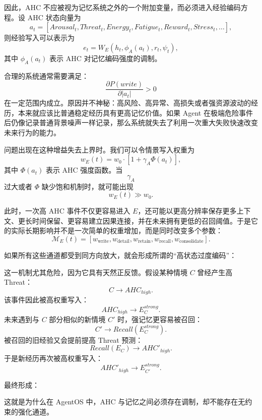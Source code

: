 因此，AHC 不应被视为记忆系统之外的一个附加变量，而必须进入经验编码方程。设 AHC 状态向量为
\[
a_t=
[
Arousal_t,
Threat_t,
Energy_t,
Fatigue_t,
Reward_t,
Stress_t,\ldots
],
\]
则经验写入可以表示为
\[
e_t
=
W_E
\left(
h_t,
\phi_A(a_t),
r_t,
\psi_t
\right),
\]
其中 $\phi_A(a_t)$ 表示 AHC 对记忆编码强度的调制。

合理的系统通常需要满足：
\[
\frac{\partial P(write)}{\partial |a_t|}
>0
\]
在一定范围内成立。原因并不神秘：高风险、高异常、高损失或者强资源波动的经历，本来就应该比普通稳定经历具有更高记忆价值。如果 Agent 在极端危险事件后仍像记录普通背景噪声一样记录，那么系统就失去了利用一次重大失败快速改变未来行为的能力。

问题出现在这种增益失去上界时。我们可以令情景写入权重为
\[
w_E(t)
=
w_0
\cdot
\left[
1+\gamma_A\Phi(a_t)
\right],
\]
其中 $\Phi(a_t)$ 表示 AHC 强度函数。当
\[
\gamma_A
\]
过大或者 $\Phi$ 缺少饱和机制时，就可能出现
\[
w_E(t)\gg w_0.
\]

此时，一次高 AHC 事件不仅更容易进入 $E$，还可能以更高分辨率保存更多上下文、更长时间保留、更容易建立因果连接，并在未来拥有更低的召回阈值。于是它的实际长期影响并不是一次简单的权重增加，而是同时改变多个参数：
\[
\mathcal M_E(t)
=
\left[
w_{\mathrm{write}},
w_{\mathrm{detail}},
w_{\mathrm{retain}},
w_{\mathrm{recall}},
w_{\mathrm{consolidate}}
\right].
\]

如果所有这些通道都受到同方向放大，就会形成所谓的“高状态过度编码”：
\begin{statementbox}
\centering
{}
\end{statementbox}

这一机制尤其危险，因为它具有天然正反馈。假设某种情境 $C$ 曾经产生高 Threat：
\[
C\rightarrow AHC_{high}.
\]
该事件因此被高权重写入：
\[
AHC_{high}\rightarrow E_C^{strong}.
\]
未来遇到与 $C$ 部分相似的新情境 $C'$ 时，强记忆更容易被召回：
\[
C'\rightarrow Recall(E_C^{strong}).
\]
被召回的旧经验又会提前提高 Threat 预测：
\[
Recall(E_C)\rightarrow AHC'_{high}.
\]
于是新经历再次被高权重写入：
\[
AHC'_{high}\rightarrow E_{C'}^{strong}.
\]

最终形成：
\begin{statementbox}
\centering
{}
\end{statementbox}

这就是为什么在 AgentOS 中，AHC 与记忆之间必须存在调制，却不能存在无约束的强化通道。

